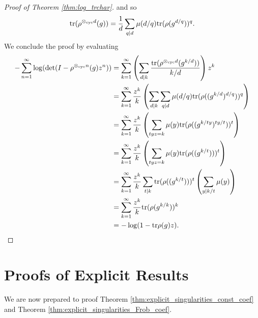 \documentclass[12pt]{amsart}
\theoremstyle{plain}
\begin{document}
\begin{proof}[Proof of Theorem \ref{thm:log_trchar}]
and so
\[
{\rm tr}(\rho^{\otimes_{\text{cyc}} d}(g)) = \frac{1}{d}\sum_{q\mid d}\mu(d/q){\rm tr}(\rho(g^{d/q}))^q.
\]
We conclude the proof by evaluating
\begin{align*}
-\sum_{n=1}^{\infty}\log(\det(I-\rho^{\otimes_{\text{cyc}} n}(g)z^n)) &=\sum_{k=1}^{\infty}\left(\sum_{d\mid k} \frac{{\rm tr}(\rho^{\otimes_{\text{cyc}} d}(g^{k/d}))}{k/d}\right)z^k\\
&=\sum_{k=1}^{\infty}\frac{z^k}{k}\left(\sum_{d\mid k} \sum_{q\mid d}\mu(d/q) {\rm tr}(\rho((g^{k/d})^{d/q}))^q\right)\\
&=\sum_{k=1}^{\infty}\frac{z^k}{k}\left(\sum_{tyz = k}\mu(y) {\rm tr}(\rho((g^{k/ty})^{ty/t}))^t\right)\\
&=\sum_{k=1}^{\infty}\frac{z^k}{k}\left(\sum_{tyz = k}\mu(y) {\rm tr}(\rho((g^{k/t})))^t\right)\\
&=\sum_{k=1}^{\infty}\frac{z^k}{k} \sum_{t\mid k}{\rm tr}(\rho((g^{k/t})))^t\left(\sum_{y\mid k/t} \mu(y)\right)\\
&=\sum_{k=1}^{\infty}\frac{z^k}{k} {\rm tr}(\rho(g^{k/k}))^k\\
&= -\log(1 - {\rm tr}\rho(g)z).
\end{align*}
\end{proof}









\section{Proofs of Explicit Results}

We are now prepared to proof Theorem \ref{thm:explicit_singularities_const_coef} and Theorem \ref{thm:explicit_singularities_Frob_coef}.
\end{document}
